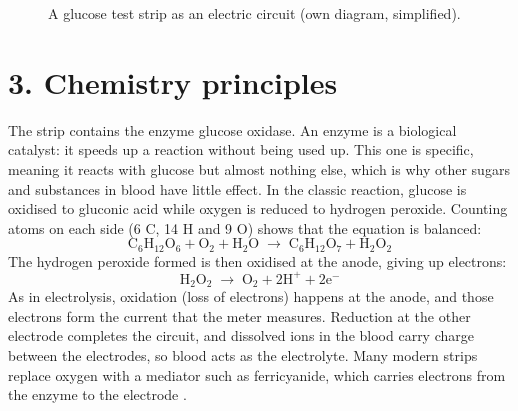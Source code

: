 \documentclass[11pt,a4paper]{article}
\begin{document}
\begin{figure}[ht]
\centering
{}
\caption{A glucose test strip as an electric circuit (own diagram, simplified).}
\label{fig:strip}
\end{figure}

\section*{3. Chemistry principles}

The strip contains the enzyme glucose oxidase. An enzyme is a biological catalyst: it speeds up a reaction without being used up. This one is specific, meaning it reacts with glucose but almost nothing else, which is why other sugars and substances in blood have little effect. In the classic reaction, glucose is oxidised to gluconic acid while oxygen is reduced to hydrogen peroxide. Counting atoms on each side (6 C, 14 H and 9 O) shows that the equation is balanced:
\[
\mathrm{C_6H_{12}O_6 + O_2 + H_2O \;\longrightarrow\; C_6H_{12}O_7 + H_2O_2}
\]
The hydrogen peroxide formed is then oxidised at the anode, giving up electrons:
\[
\mathrm{H_2O_2 \;\longrightarrow\; O_2 + 2H^+ + 2e^-}
\]
As in electrolysis, oxidation (loss of electrons) happens at the anode, and those electrons form the current that the meter measures. Reduction at the other electrode completes the circuit, and dissolved ions in the blood carry charge between the electrodes, so blood acts as the electrolyte. Many modern strips replace oxygen with a mediator such as ferricyanide, which carries electrons from the enzyme to the electrode \cite{wang}.
\end{document}
